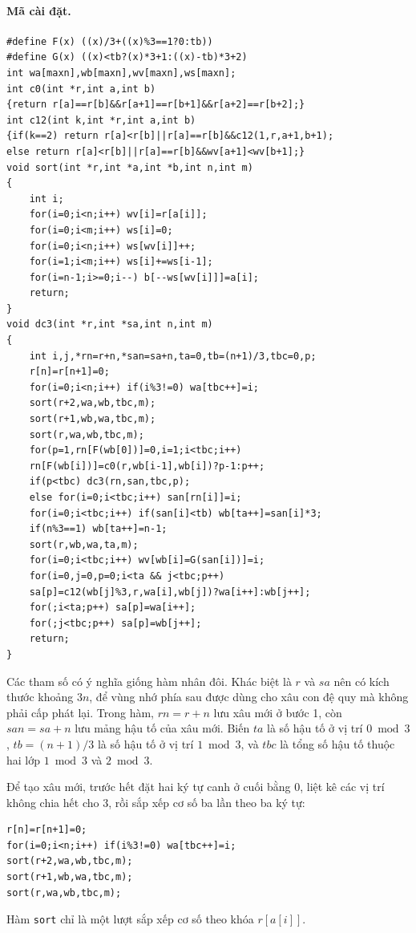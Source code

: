 \documentclass[11pt]{article}
\begin{document}
\paragraph{Mã cài đặt.}
\begin{verbatim}
#define F(x) ((x)/3+((x)%3==1?0:tb))
#define G(x) ((x)<tb?(x)*3+1:((x)-tb)*3+2)
int wa[maxn],wb[maxn],wv[maxn],ws[maxn];
int c0(int *r,int a,int b)
{return r[a]==r[b]&&r[a+1]==r[b+1]&&r[a+2]==r[b+2];}
int c12(int k,int *r,int a,int b)
{if(k==2) return r[a]<r[b]||r[a]==r[b]&&c12(1,r,a+1,b+1);
else return r[a]<r[b]||r[a]==r[b]&&wv[a+1]<wv[b+1];}
void sort(int *r,int *a,int *b,int n,int m)
{
    int i;
    for(i=0;i<n;i++) wv[i]=r[a[i]];
    for(i=0;i<m;i++) ws[i]=0;
    for(i=0;i<n;i++) ws[wv[i]]++;
    for(i=1;i<m;i++) ws[i]+=ws[i-1];
    for(i=n-1;i>=0;i--) b[--ws[wv[i]]]=a[i];
    return;
}
void dc3(int *r,int *sa,int n,int m)
{
    int i,j,*rn=r+n,*san=sa+n,ta=0,tb=(n+1)/3,tbc=0,p;
    r[n]=r[n+1]=0;
    for(i=0;i<n;i++) if(i%3!=0) wa[tbc++]=i;
    sort(r+2,wa,wb,tbc,m);
    sort(r+1,wb,wa,tbc,m);
    sort(r,wa,wb,tbc,m);
    for(p=1,rn[F(wb[0])]=0,i=1;i<tbc;i++)
    rn[F(wb[i])]=c0(r,wb[i-1],wb[i])?p-1:p++;
    if(p<tbc) dc3(rn,san,tbc,p);
    else for(i=0;i<tbc;i++) san[rn[i]]=i;
    for(i=0;i<tbc;i++) if(san[i]<tb) wb[ta++]=san[i]*3;
    if(n%3==1) wb[ta++]=n-1;
    sort(r,wb,wa,ta,m);
    for(i=0;i<tbc;i++) wv[wb[i]=G(san[i])]=i;
    for(i=0,j=0,p=0;i<ta && j<tbc;p++)
    sa[p]=c12(wb[j]%3,r,wa[i],wb[j])?wa[i++]:wb[j++];
    for(;i<ta;p++) sa[p]=wa[i++];
    for(;j<tbc;p++) sa[p]=wb[j++];
    return;
}
\end{verbatim}

Các tham số có ý nghĩa giống hàm nhân đôi. Khác biệt là \(r\) và \(sa\) nên
có kích thước khoảng \(3n\), để vùng nhớ phía sau được dùng cho xâu con đệ quy
mà không phải cấp phát lại. Trong hàm, \(rn=r+n\) lưu xâu mới ở bước 1, còn
\(san=sa+n\) lưu mảng hậu tố của xâu mới. Biến \(ta\) là số hậu tố ở vị trí
\(0\bmod 3\), \(tb=(n+1)/3\) là số hậu tố ở vị trí \(1\bmod 3\), và \(tbc\)
là tổng số hậu tố thuộc hai lớp \(1\bmod 3\) và \(2\bmod 3\).

Để tạo xâu mới, trước hết đặt hai ký tự canh ở cuối bằng \(0\), liệt kê các
vị trí không chia hết cho \(3\), rồi sắp xếp cơ số ba lần theo ba ký tự:
\begin{verbatim}
r[n]=r[n+1]=0;
for(i=0;i<n;i++) if(i%3!=0) wa[tbc++]=i;
sort(r+2,wa,wb,tbc,m);
sort(r+1,wb,wa,tbc,m);
sort(r,wa,wb,tbc,m);
\end{verbatim}
Hàm \texttt{sort} chỉ là một lượt sắp xếp cơ số theo khóa \(r[a[i]]\).
\end{document}
